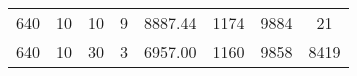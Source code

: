 \begin{table}[H]
\begin{tabular}{l|ccccccc}
 640                                                                  & 10                                                                                                                                                             & 10                                                                                                                               & 9                                                                                                                                                              & 8887.44                                                                                                                          & 1174                         & 9884                         & 21                                                                   \\
 640                                                                  & 10                                                                                                                                                             & 30                                                                                                                               & 3                                                                                                                                                              & 6957.00                                                                                                                          & 1160                         & 9858                         & 8419                                                                 \\
        \hline
    \end{tabular}
\end{table}